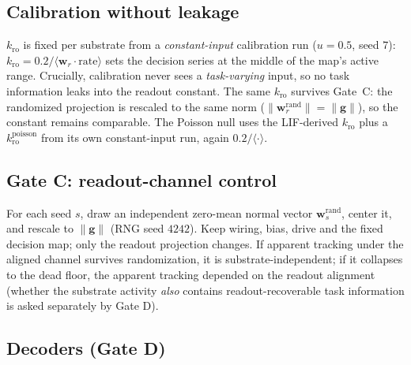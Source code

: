\documentclass[12pt]{article}
\begin{document}
\subsection{Calibration without leakage}\label{sec:calib}

$k_{\mathrm{ro}}$ is fixed per substrate from a \emph{constant-input}
calibration run ($u=0.5$, seed $7$): $k_{\mathrm{ro}}=0.2/
\langle \mathbf{w}_r\!\cdot \mathrm{rate}\rangle$ sets the decision
series at the middle of the map's active range. Crucially, calibration
never sees a \emph{task-varying} input, so no task information leaks
into the readout constant. The same $k_{\mathrm{ro}}$ survives Gate~C:
the randomized projection is rescaled to the same norm
($\|\mathbf{w}_r^{\mathrm{rand}}\|=\|\mathbf{g}\|$), so the constant
remains comparable. The Poisson null uses the LIF-derived $k_{\mathrm{ro}}$
plus a $k_{\mathrm{ro}}^{\mathrm{poisson}}$ from its own constant-input
run, again $0.2/\langle\cdot\rangle$.

\subsection{Gate C: readout-channel control}\label{sec:gatec}

For each seed $s$, draw an independent zero-mean normal vector
$\mathbf{w}^{\mathrm{rand}}_s$, center it, and rescale to
$\|\mathbf{g}\|$ (RNG seed $4242$). Keep wiring, bias, drive and the
fixed decision map; only the readout projection changes. If apparent
tracking under the aligned channel survives randomization, it is
substrate-independent; if it collapses to the dead floor, the apparent
tracking depended on the readout alignment (whether the substrate
activity \emph{also} contains readout-recoverable task information is
asked separately by Gate D).

\subsection{Decoders (Gate D)}\label{sec:decoders}
\end{document}
